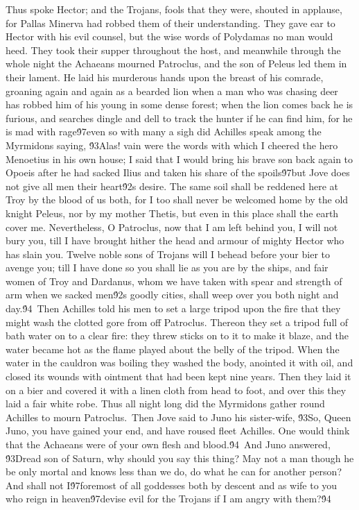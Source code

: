 {Thus spoke Hector; and the Trojans, fools that they were, shouted in applause, for Pallas Minerva had robbed them of their understanding. They gave ear to Hector with his evil counsel, but the wise words of Polydamas no man would heed. They took their supper throughout the host, and meanwhile through the whole night the Achaeans mourned Patroclus, and the son of Peleus led them in their lament. He laid his murderous hands upon the breast of his comrade, groaning again and again as a bearded lion when a man who was chasing deer has robbed him of his young in some dense forest; when the lion comes back he is furious, and searches dingle and dell to track the hunter if he can find him, for he is mad with rage\'97even so with many a sigh did Achilles speak among the Myrmidons saying, \'93Alas! vain were the words with which I cheered the hero Menoetius in his own house; I said that I would bring his brave son back again to Opoeis after he had sacked Ilius and taken his share of the spoils\'97but Jove does not give all men their heart\'92s desire. The same soil shall be reddened here at Troy by the blood of us both, for I too shall never be welcomed home by the old knight Peleus, nor by my mother Thetis, but even in this place shall the earth cover me. Nevertheless, O Patroclus, now that I am left behind you, I will not bury you, till I have brought hither the head and armour of mighty Hector who has slain you. Twelve noble sons of Trojans will I behead before your bier to avenge you; till I have done so you shall lie as you are by the ships, and fair women of Troy and Dardanus, whom we have taken with spear and strength of arm when we sacked men\'92s goodly cities, shall weep over you both night and day.\'94\
Then Achilles told his men to set a large tripod upon the fire that they might wash the clotted gore from off Patroclus. Thereon they set a tripod full of bath water on to a clear fire: they threw sticks on to it to make it blaze, and the water became hot as the flame played about the belly of the tripod. When the water in the cauldron was boiling they washed the body, anointed it with oil, and closed its wounds with ointment that had been kept nine years. Then they laid it on a bier and covered it with a linen cloth from head to foot, and over this they laid a fair white robe. Thus all night long did the Myrmidons gather round Achilles to mourn Patroclus.\
Then Jove said to Juno his sister-wife, \'93So, Queen Juno, you have gained your end, and have roused fleet Achilles. One would think that the Achaeans were of your own flesh and blood.\'94\
And Juno answered, \'93Dread son of Saturn, why should you say this thing? May not a man though he be only mortal and knows less than we do, do what he can for another person? And shall not I\'97foremost of all goddesses both by descent and as wife to you who reign in heaven\'97devise evil for the Trojans if I am angry with them?\'94\
}
